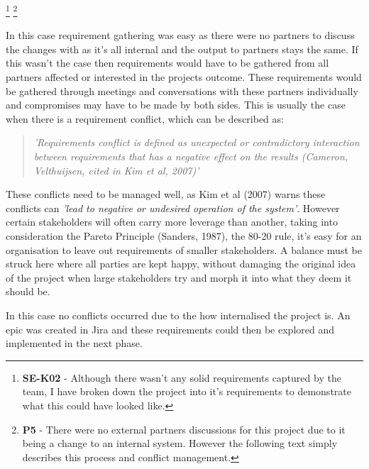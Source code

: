   \footnote{\textbf{SE-K02} - Although there wasn't any solid requirements captured by the team, I have broken down the project into it's requirements
  to demonstrate what this could have looked like.}
  \footnote{\textbf{P5} - There were no external partners discussions for this project due to it being a change to an internal system. However the
  following text simply describes this process and conflict management.}
  
  In this case requirement gathering was easy as there were no partners to discuss the changes with as it's all internal and the output to partners
  stays the same. If this wasn't the case then requirements would have to be gathered from all partners affected or interested in the projects 
  outcome. These requirements would be gathered through meetings and conversations with these partners individually and compromises may have to 
  be made by both sides.
  This is usually the case when there is a requirement conflict, which can be described as:
  \begin{quote}
    \textit{'Requirements conflict is defined as unexpected or contradictory interaction between requirements that has a negative 
    effect on the results (Cameron, Velthuijsen, cited in Kim et al, 2007)'}
  \end{quote}
  These conflicts need to be managed well, as Kim et al (2007) warns these conflicts can \textit{'lead 
  to negative or undesired operation of the system'}. However certain stakeholders will often carry more leverage than another, taking into 
  consideration the Pareto Principle (Sanders, 1987), the 80-20 rule, it's easy for an organisation to leave out requirements of smaller stakeholders.
  A balance must be struck here where all parties are kept happy, without damaging the original idea of the project when large stakeholders try 
  and morph it into what they deem it should be.

  In this case no conflicts occurred due to the how internalised the project is. An epic was created in Jira and these requirements could then be explored 
  and implemented in the next phase.

\newpage